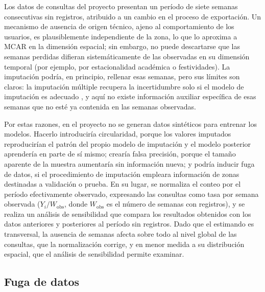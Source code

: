 Los datos de consultas del proyecto presentan un período de siete semanas consecutivas sin
registros, atribuido a un cambio en el proceso de exportación. Un mecanismo de ausencia de
origen técnico, ajeno al comportamiento de los usuarios, es plausiblemente independiente de
la zona, lo que lo aproxima a MCAR en la dimensión espacial; sin embargo, no puede
descartarse que las semanas perdidas difieran sistemáticamente de las observadas en su
dimensión temporal (por ejemplo, por estacionalidad académica o festividades). La imputación
podría, en principio, rellenar esas semanas, pero sus límites son claros: la imputación
múltiple recupera la incertidumbre solo si el modelo de imputación es adecuado
\parencite{vanbuuren2018}, y aquí no existe información auxiliar específica de esas semanas
que no esté ya contenida en las semanas observadas.

Por estas razones, en el proyecto no se generan datos sintéticos para entrenar los modelos.
Hacerlo introduciría circularidad, porque los valores imputados reproducirían el patrón del
propio modelo de imputación y el modelo posterior aprendería en parte de sí mismo; crearía
falsa precisión, porque el tamaño aparente de la muestra aumentaría sin información nueva; y
podría inducir fuga de datos, si el procedimiento de imputación empleara información de
zonas destinadas a validación o prueba. En su lugar, se normaliza el conteo por el período
efectivamente observado, expresando las consultas como tasa por semana observada
($Y_i / W_{\mathrm{obs}}$, donde $W_{\mathrm{obs}}$ es el número de semanas con registros),
y se realiza un análisis de sensibilidad que compara los resultados obtenidos con los datos
anteriores y posteriores al período sin registros. Dado que el estimando es transversal, la
ausencia de semanas afecta sobre todo al nivel global de las consultas, que la normalización
corrige, y en menor medida a su distribución espacial, que el análisis de sensibilidad
permite examinar.

\subsection{Fuga de datos}
\label{subsec:fuga-datos}


